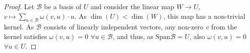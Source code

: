 \documentclass{article}
\newcommand{\Span}{\mathrm{Span}}
\begin{document}
\begin{proof}
   Let $\mathcal{B}$ be a basis of $U$ and consider the linear map $W\to U$, $v \mapsto \sum_{u\in \mathcal{B}} \omega(v,u) \cdot u$. As $\dim(U) < \dim(W)$, this map has a non-trivial kernel. As $\mathcal{B}$ consists of linearly independent vectors, any non-zero $v$ from the kernel satisfies $\omega(v,u) = 0$ $\forall u\in\mathcal{B}$, and thus, as $\Span \mathcal{B} = U$, also $\omega(v,u) = 0$ $\forall u \in U$.
    
\end{proof}
\end{document}
